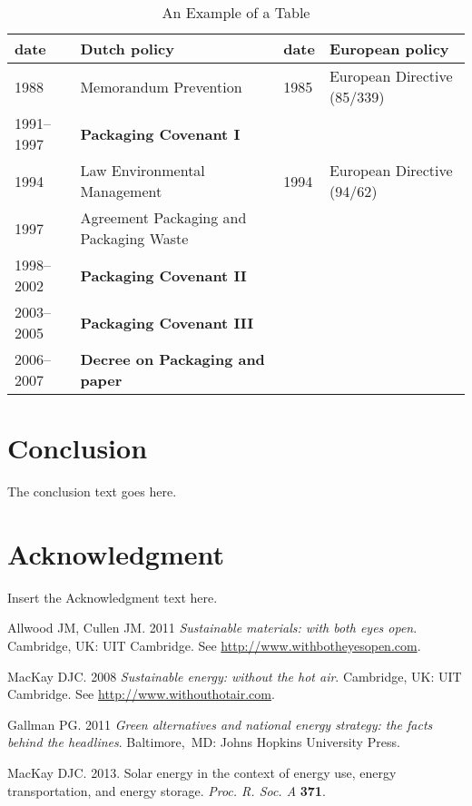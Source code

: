 \documentclass{rsproca}%
\begin{document}
\begin{table}[!h]
\caption{An Example of a Table}%
\label{table_example}
\begin{tabular}{llll}%
\hline
date &Dutch policy &date &European policy \\
\hline
1988 &Memorandum Prevention &1985 &European Directive (85/339) \\
1991--1997 &{\bf Packaging Covenant I} & & \\
1994 &Law Environmental Management &1994 &European Directive (94/62) \\
1997 &Agreement Packaging and Packaging Waste & & \\
1998--2002 &{\bf Packaging Covenant II} & & \\
2003--2005 &{\bf Packaging Covenant III} & & \\
2006--2007 &{\bf Decree on Packaging and paper} & & \\\hline
\end{tabular}
\end{table}%

\section{Conclusion}
The conclusion text goes here.

\section*{Acknowledgment}

Insert the Acknowledgment text here.



\begin{thebibliography}{9}

 Allwood JM, Cullen JM. 2011 \textit{Sustainable materials:  with both eyes open}.
Cambridge, UK: UIT Cambridge. See \href{http://www.withbotheyesopen.com}{http://www.withbotheyesopen.com}.

  MacKay DJC. 2008  \textit{Sustainable energy:  without the hot air}.
 Cambridge, UK: UIT Cambridge. See \href{http://www.withouthotair.com}{http://www.withouthotair.com}.

 Gallman PG. 2011  \textit{Green alternatives and national energy strategy: the facts
 behind the headlines}.  Baltimore,\ MD: Johns Hopkins University Press.

 MacKay DJC. 2013.  Solar energy in the context of energy use, energy transportation, and
 energy storage. \textit{Proc. R. Soc. A} \textbf{371}.

\end{thebibliography}
\end{document}
